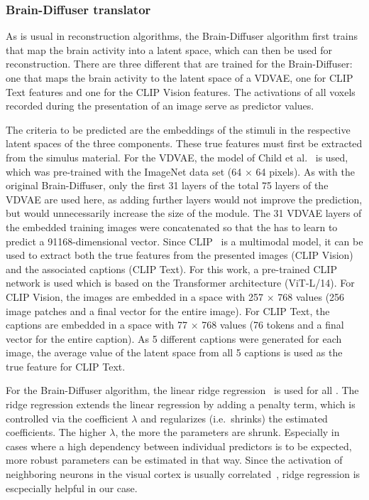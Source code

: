 \subsubsection{Brain-Diffuser translator}
As is usual in reconstruction algorithms, the Brain-Diffuser algorithm first trains  that map the brain activity into a latent space, which can then be used for reconstruction. There are three different  that are trained for the Brain-Diffuser: one that maps the brain activity to the latent space of a VDVAE, one for CLIP Text features and one for the CLIP Vision features. The activations of all voxels recorded during the presentation of an image serve as predictor values.

The criteria to be predicted are the embeddings of the stimuli in the respective latent spaces of the three components. These true features must first be extracted from the simulus material. For the VDVAE, the model of Child et al.~\cite{childVeryDeepVAEs2020} is used, which was pre-trained with the ImageNet data set (64 $\times$ 64 pixels). As with the original Brain-Diffuser, only the first 31 layers of the total 75 layers of the VDVAE are used here, as adding further layers would not improve the prediction, but would unnecessarily increase the size of the  module. The 31 VDVAE layers of the embedded training images were concatenated so that the  has to learn to predict a 91168-dimensional vector. 
Since CLIP~\cite{radfordLearningTransferableVisual2021} is a multimodal model, it can be used to extract both the true features from the presented images (CLIP Vision) and the associated captions (CLIP Text). For this work, a pre-trained CLIP network is used which is based on the Transformer architecture (ViT-L/14). For CLIP Vision, the images are embedded in a space with 257 $\times$ 768 values (256 image patches and a final vector for the entire image). For CLIP Text, the captions are embedded in a space with 77 $\times$ 768 values (76 tokens and a final vector for the entire caption). As 5 different captions were generated for each image, the average value of the latent space from all 5 captions is used as the true feature for CLIP Text.


For the Brain-Diffuser algorithm, the linear ridge regression~\cite{hoerlRidgeRegressionBiased1970} is used for all . The ridge regression extends the linear regression by adding a penalty term, which is controlled via the coefficient $\lambda$ and regularizes (i.e.\ shrinks) the estimated coefficients. The higher $\lambda$, the more the parameters are shrunk. Especially in cases where a high dependency between individual predictors is to be expected, more robust parameters can be estimated in that way. Since the activation of neighboring neurons in the visual cortex is usually correlated~\cite{smithSpatialTemporalScales2008}, ridge regression is escpecially helpful in our case.

